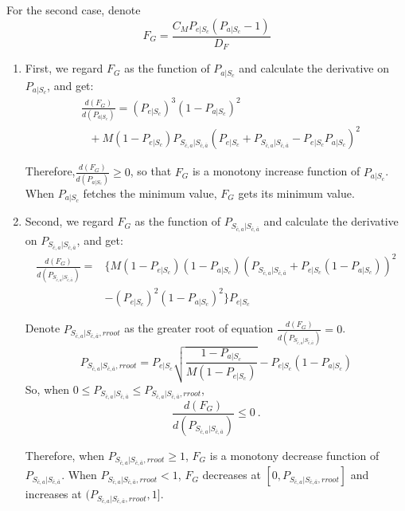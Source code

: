 For the second case, denote
    $$F_G = \frac{C_{M}P_{e|S_{c}}(P_{a|S_{c}}-1)}{D_{F}}$$


\begin{enumerate}
\item
    First, we regard $F_G$ as the function of $P_{a|S_{c}}$ and calculate the derivative on $P_{a|S_{c}}$, and get:
    \begin{equation*}
    \begin{aligned}
    &\frac{d(F_G)}{d(P_{a|S_{c}})} = (P_{e|S_{c}})^{3}(1-P_{a|S_{c}})^2\\
    &\ \ \ +M(1-P_{e|S_{c}})P_{S_{\bar{c}, a}|S_{\bar{c},\bar{a}}}(P_{e|S_{c}}+P_{S_{\bar{c}, a}|S_{\bar{c},\bar{a}}}-P_{e|S_{c}}P_{a|S_{c}})^{2}
    \end{aligned}
    \end{equation*}

Therefore,$\frac{d(F_G)}{d(P_{a|S_{c}})} \geq 0$, so that $F_G$ is a monotony increase function of $P_{a|S_{c}}$.
When $P_{a|S_{c}}$ fetches the minimum value, $F_G$ gets its minimum value.

\item
Second, we regard $F_G$ as the function of $P_{S_{\bar{c}, a}|S_{\bar{c},\bar{a}}}$ and calculate the derivative on $P_{S_{\bar{c}, a}|S_{\bar{c},\bar{a}}}$, and get:
\begin{equation*}
\begin{split}
\frac{d(F_G)}{d(P_{S_{\bar{c}, a}|S_{\bar{c},\bar{a}}})} = &\{M(1-P_{e|S_{c}})(1-P_{a|S_{c}})(P_{S_{\bar{c}, a}|S_{\bar{c},\bar{a}}}+P_{e|S_{c}}(1-P_{a|S_{c}}))^2\\
&-(P_{e|S_{c}})^2(1-P_{a|S_{c}})^2 \}P_{e|S_{c}}
\end{split}
\end{equation*}

Denote $P_{S_{\bar{c}, a}|S_{\bar{c},\bar{a}},rroot}$ as the greater root of equation $\frac{d(F_G)}{d(P_{S_{\bar{c}, a}|S_{\bar{c},\bar{a}}})}=0$.
\begin{equation*}
  P_{S_{\bar{c}, a}|S_{\bar{c},\bar{a}},rroot} = P_{e|S_{c}}\sqrt{\frac{1-P_{a|S_{c}}}{M(1-P_{e|S_{c}})}}-P_{e|S_{c}}(1-P_{a|S_{c}})
\end{equation*}
So, when $
0 \leq P_{S_{\bar{c}, a}|S_{\bar{c},\bar{a}}} \leq P_{S_{\bar{c}, a}|S_{\bar{c},\bar{a}},rroot}
$,
$$\frac{d(F_G)}{d(P_{S_{\bar{c}, a}|S_{\bar{c},\bar{a}}})} \leq 0 \ .$$

Therefore, when $P_{S_{\bar{c}, a}|S_{\bar{c},\bar{a}},rroot} \geq 1$, $F_G$ is a monotony decrease function of $P_{S_{\bar{c}, a}|S_{\bar{c},\bar{a}}}$.
When $P_{S_{\bar{c}, a}|S_{\bar{c},\bar{a}},rroot} < 1$, $F_G$ decreases at $[0,P_{S_{\bar{c}, a}|S_{\bar{c},\bar{a}},rroot}]$ and increases at $(P_{S_{\bar{c}, a}|S_{\bar{c},\bar{a}},rroot},1]$.


\end{enumerate}
